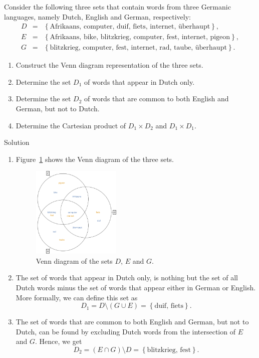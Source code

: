 \ifvc
\begin{example}
	Consider the following three sets that contain words from three Germanic languages, namely Dutch, English and German, respectively:
	\begin{eqnarray*}
		D&=&\left\{\mbox{Afrikaans, computer, duif, fiets, internet, \"uberhaupt}\right\},\\
		E&=&\left\{\mbox{Afrikaans, bike, blitzkrieg, computer, fest, internet, pigeon}\right\},\\
		G&=&\left\{\mbox{blitzkrieg, computer, fest, internet, rad, taube, \"uberhaupt}\right\}.
	\end{eqnarray*}
	\begin{enumerate}
		\item Construct the Venn diagram representation of the three sets. 
		\item Determine the set $D_1$ of words that appear in Dutch only.
		\item Determine the set $D_2$ of words that are common to both English and German, but not to Dutch. 
		\item Determine the Cartesian product of $D_1\times D_2$ and $D_1\times D_1$.
	\end{enumerate}
	
	Solution 
	
	\begin{enumerate}
		\item Figure~\ref{fig_sets_4} shows the Venn diagram of the three sets. 
		\begin{figure}[H]
			\begin{center}
				\includegraphics[width=0.4\textwidth]{fig_sets_4}
				\caption{Venn diagram of the sets $D$, $E$ and $G$.}
				\label{fig_sets_4}
			\end{center}
		\end{figure}
		
		\item \label{setexampleD1} The set of words that appear in Dutch only, is nothing but the set of all Dutch words minus the set of words that appear either in German or English. More formally, we can define this set as
		$$
		D_1=D\setminus \left(G\cup E\right)=\left\{\mbox{duif, fiets}\right\}.
		$$
		\item \label{setexampleD2} The set of words that are common to both English and German, but not to Dutch,  can be found by excluding Dutch words from the intersection of $E$ and $G$. Hence, we get
		$$
		D_2=(E\cap G)\setminus D=\left\{\mbox{blitzkrieg, fest}\right\}.
		$$
		

\end{enumerate}
\end{example}
